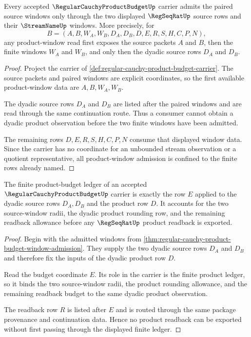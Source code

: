 \begin{theorem}
\label{thm:regular-cauchy-product-budget-window-admission}
Every accepted $\RegularCauchyProductBudgetUp$ carrier admits the paired source windows only through the two displayed $\RegSeqRatUp$ source rows and their $\StreamNameUp$ windows. More precisely, for
$$
B=(A,B,W_A,W_B,D_A,D_B,D,E,R,S,H,C,P,N),
$$
any product-window read first exposes the source packets $A$ and $B$, then the finite windows $W_A$ and $W_B$, and only then the dyadic source rows $D_A$ and $D_B$.
\end{theorem}
\begin{proof}
Project the carrier of \autoref{def:regular-cauchy-product-budget-carrier}. The source packets and paired windows are explicit coordinates, so the first available product-window data are $A,B,W_A,W_B$.

The dyadic source rows $D_A$ and $D_B$ are listed after the paired windows and are read through the same continuation route. Thus a consumer cannot obtain a dyadic product observation before the two finite windows have been admitted.

The remaining rows $D,E,R,S,H,C,P,N$ consume that displayed window data. Since the carrier has no coordinate for an unbounded stream observation or a quotient representative, all product-window admission is confined to the finite rows already named.
\end{proof}

\begin{theorem}
\label{thm:regular-cauchy-product-budget-ledger-exactness}
The finite product-budget ledger of an accepted $\RegularCauchyProductBudgetUp$ carrier is exactly the row $E$ applied to the dyadic source rows $D_A,D_B$ and the product row $D$. It accounts for the two source-window radii, the dyadic product rounding row, and the remaining readback allowance before any $\RegSeqRatUp$ product readback is exported.
\end{theorem}
\begin{proof}
Begin with the admitted windows from \autoref{thm:regular-cauchy-product-budget-window-admission}. They supply the two dyadic source rows $D_A$ and $D_B$ and therefore fix the inputs of the dyadic product row $D$.

Read the budget coordinate $E$. Its role in the carrier is the finite product ledger, so it binds the two source-window radii, the product rounding allowance, and the remaining readback budget to the same dyadic product observation.

The readback row $R$ is listed after $E$ and is routed through the same package provenance and continuation data. Hence no product readback can be exported without first passing through the displayed finite ledger.
\end{proof}

